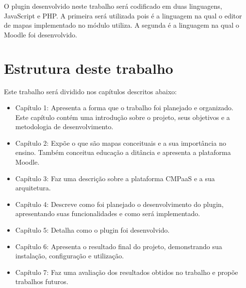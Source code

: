 \documentclass[
	12pt,				%
	openright,			%
	oneside,			%
	a4paper,			%
	english,			%
	french,				%
	spanish,			%
	brazil				%
	]{abntex2}
\begin{document}
O plugin desenvolvido neste trabalho será codificado em duas linguagens, JavaScript e PHP. A primeira será utilizada pois é a linguagem na qual o editor de mapas implementado no módulo utiliza. A segunda é a linguagem na qual o Moodle foi desenvolvido.  

\section{Estrutura deste trabalho}

Este trabalho será dividido nos capítulos descritos abaixo:

\begin{itemize}
	\item Capítulo 1: Apresenta a forma que o trabalho foi planejado e organizado. Este capítulo contém uma introdução sobre o projeto, seus objetivos e a metodologia de desenvolvimento.
	\item Capítulo 2: Expõe o que são mapas conceituais e a sua importância no ensino. Também conceitua educação a ditância e apresenta a plataforma Moodle.
	\item Capítulo 3: Faz uma descrição sobre a  plataforma CMPaaS e a sua arquitetura.    
	\item Capítulo 4: Descreve como foi planejado o desenvolvimento do plugin, apresentando suas funcionalidades e como será implementado.
	\item Capítulo 5: Detalha como o plugin foi desenvolvido.
	\item Capítulo 6: Apresenta o resultado final do projeto, demonstrando sua instalação, configuração e utilização.
	\item Capítulo 7: Faz uma avaliação dos resultados obtidos no trabalho e propõe trabalhos futuros.
\end{itemize} 




\end{document}
